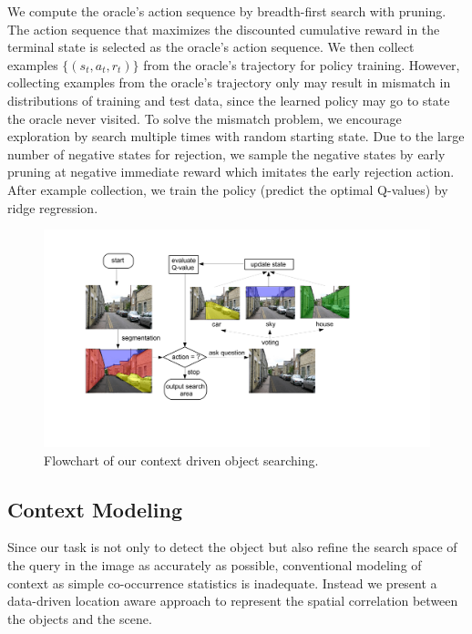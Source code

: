 We compute the oracle's action sequence by breadth-first
search with pruning. The action sequence that maximizes the discounted
cumulative reward in the terminal state is selected as the oracle's action
sequence.
We then collect examples $\{(s_t,a_t,r_t)\}$ from the oracle's trajectory for
policy training.
However, collecting examples from the oracle's trajectory
only may result in mismatch in distributions of training and test data, since
the learned policy may go to state the oracle never visited.
To solve the mismatch problem, we encourage exploration by search multiple
times with random starting state.  Due to the large number of negative states for rejection, we sample the negative states by early pruning at negative immediate reward which imitates the early rejection action. After example collection, we train the policy (predict the optimal Q-values) by
ridge regression.

\begin{figure}[htb]
\begin{center}
\includegraphics[width=0.8\linewidth]{figures/flowchart_Q.pdf}
\caption{Flowchart of our context driven object searching. %
}
\label{fig:flowchart}
\end{center}
\end{figure}

\subsection{Context Modeling}
\label{sec:context}
Since our task is not only to detect the object but also refine the search space of the query in the image as accurately as possible, conventional modeling of context as simple co-occurrence statistics is inadequate. Instead we present a data-driven location aware approach to represent the spatial correlation between the objects and the scene. 

